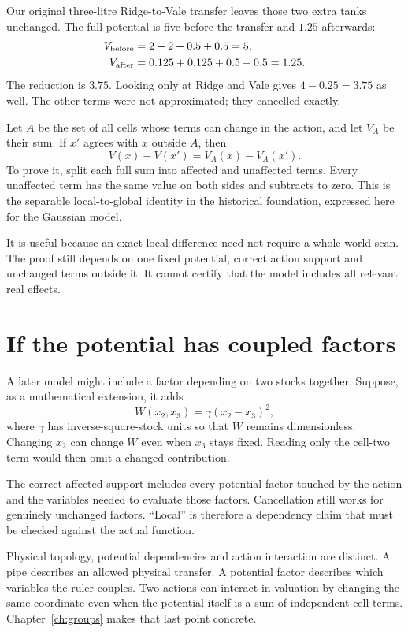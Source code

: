 Our original three-litre Ridge-to-Vale transfer leaves those two extra tanks unchanged. The full potential is five before the transfer and $1.25$ afterwards:
\begin{align*}
 V_{\rm before}&=2+2+0.5+0.5=5,\\
 V_{\rm after}&=0.125+0.125+0.5+0.5=1.25.
\end{align*}
The reduction is $3.75$. Looking only at Ridge and Vale gives $4-0.25=3.75$ as well. The other terms were not approximated; they cancelled exactly.

Let $A$ be the set of all cells whose terms can change in the action, and let $V_A$ be their sum. If $x'$ agrees with $x$ outside $A$, then
\begin{equation}\label{eq:locality}
 V(x)-V(x')=V_A(x)-V_A(x').
\end{equation}
To prove it, split each full sum into affected and unaffected terms. Every unaffected term has the same value on both sides and subtracts to zero. This is the separable local-to-global identity in the historical foundation, expressed here for the Gaussian model.\cite{foundation}

It is useful because an exact local difference need not require a whole-world scan. The proof still depends on one fixed potential, correct action support and unchanged terms outside it. It cannot certify that the model includes all relevant real effects.

\section{If the potential has coupled factors}
A later model might include a factor depending on two stocks together. Suppose, as a mathematical extension, it adds
\begin{equation*}
 W(x_2,x_3)=\gamma(x_2-x_3)^2,
\end{equation*}
where $\gamma$ has inverse-square-stock units so that $W$ remains dimensionless. Changing $x_2$ can change $W$ even when $x_3$ stays fixed. Reading only the cell-two term would then omit a changed contribution.

The correct affected support includes every potential factor touched by the action and the variables needed to evaluate those factors. Cancellation still works for genuinely unchanged factors. ``Local'' is therefore a dependency claim that must be checked against the actual function.

Physical topology, potential dependencies and action interaction are distinct. A pipe describes an allowed physical transfer. A potential factor describes which variables the ruler couples. Two actions can interact in valuation by changing the same coordinate even when the potential itself is a sum of independent cell terms. Chapter~\ref{ch:groups} makes that last point concrete.

